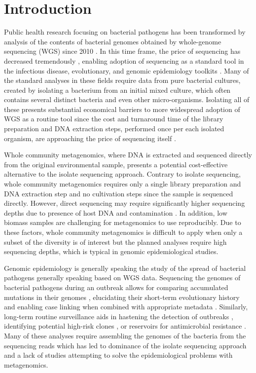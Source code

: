\documentclass[officiallayout]{tktla}
\begin{document}
\chapter{Introduction}
\sloppy

Public health research focusing on bacterial pathogens has been
transformed by analysis of the contents of bacterial genomes obtained
by whole-genome sequencing (WGS) since 2010
\citep{armstrong2019pathogen}. In this time frame, the price of
sequencing has decreased tremendously \citep{dnaseqcost,
  goodwin2016coming}, enabling adoption of sequencing as a standard
tool in the infectious disease, evolutionary, and genomic epidemiology
toolkits \citep{tang2017infection, grad2014epidemiologic,
  kwong2015whole}. Many of the standard analyses in these fields
require data from pure bacterial cultures, created by isolating a
bacterium from an initial mixed culture, which often contains several
distinct bacteria and even other micro-organisms. Isolating all of
these presents substantial economical barriers to more widespread
adoption of WGS as a routine tool since the cost and turnaround time
of the library preparation and DNA extraction steps, performed once
per each isolated organism, are approaching the price of sequencing
itself \citep{rossen2018practical}.

Whole community metagenomics, where DNA is extracted and
sequenced directly from the original environmental sample, presents a
potential cost-effective alternative to the isolate sequencing
approach. Contrary to isolate sequencing, whole community metagenomics requires
only a single library preparation and DNA extraction step and no
cultivation steps since the sample is sequenced directly. However,
direct sequencing may require significantly higher sequencing depths
due to presence of host DNA \citep{pereira2019impact,
  mcardle2020sensitivity} and contamination
\citep{mcardle2020sensitivity, salter2014reagent}. In addition, low
biomass samples are challenging for metagenomics to use
reproducibly. Due to these factors, whole community metagenomics is difficult
to apply when only a subset of the diversity is of interest but the
planned analyses require high sequencing depths, which is
typical in genomic epidemiological studies.

Genomic epidemiology is generally speaking the study of the spread of
bacterial pathogens generally speaking based on WGS data. Sequencing
the genomes of bacterial pathogens during an outbreak allows for
comparing accumulated mutations in their genomes
\citep{tang2017infection}, elucidating their short-term evolutionary
history and enabling case linking when combined with appropriate
metadata \citep{grad2014epidemiologic, hill2021progress}. Similarly,
long-term routine surveillance aids in hastening the detection of
outbreaks \citep{eyre2012pilot, gardy2018towards}, identifying
potential high-risk clones \citep{aanensen2016whole}, or reservoirs
for antimicrobial resistance \citep{weingarten2018genomic,
  coipan2020genomic}. Many of these analyses require assembling the
genomes of the bacteria from the sequencing reads which has led to
dominance of the isolate sequencing approach and a lack of studies
attempting to solve the epidemiological problems with metagenomics.
\end{document}
